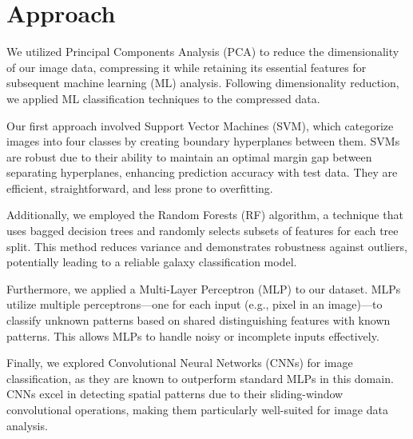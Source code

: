 \section{Approach}
We utilized Principal Components Analysis (PCA) to reduce the dimensionality of our image data, compressing it while retaining its essential features for subsequent machine learning (ML) analysis. Following dimensionality reduction, we applied ML classification techniques to the compressed data.

Our first approach involved Support Vector Machines (SVM), which categorize images into four classes by creating boundary hyperplanes between them. SVMs are robust due to their ability to maintain an optimal margin gap between separating hyperplanes, enhancing prediction accuracy with test data. They are efficient, straightforward, and less prone to overfitting.

Additionally, we employed the Random Forests (RF) algorithm, a technique that uses bagged decision trees and randomly selects subsets of features for each tree split. This method reduces variance and demonstrates robustness against outliers, potentially leading to a reliable galaxy classification model.

Furthermore, we applied a Multi-Layer Perceptron (MLP) to our dataset. MLPs utilize multiple perceptrons—one for each input (e.g., pixel in an image)—to classify unknown patterns based on shared distinguishing features with known patterns. This allows MLPs to handle noisy or incomplete inputs effectively.

Finally, we explored Convolutional Neural Networks (CNNs) for image classification, as they are known to outperform standard MLPs in this domain. CNNs excel in detecting spatial patterns due to their sliding-window convolutional operations, making them particularly well-suited for image data analysis.
